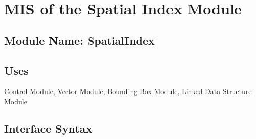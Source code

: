 \documentclass[12pt]{article}
\newcommand{\Control}{\hyperref[MISControl]{Control Module}}
\newcommand{\Vector}{\hyperref[MISVector]{Vector Module}}
\newcommand{\BB}{\hyperref[MISBB]{Bounding Box Module}}
\newcommand{\Linked}{\hyperref[MISLinked]{Linked Data Structure Module}}
\begin{document}

\section{MIS of the Spatial Index Module} \label{MISSpatial}

\subsection{Module Name: SpatialIndex} 

\subsection{Uses} \label{SecUSpatial}
	\Control, \Vector, \BB, \Linked

\subsection{Interface Syntax}


\end{document}
